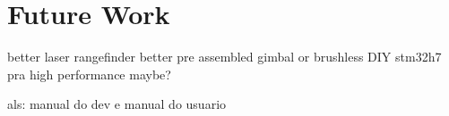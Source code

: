 
\chapter{Future Work}

better laser rangefinder
better pre assembled gimbal or brushless DIY
stm32h7 pra high performance maybe?

als: manual do dev e manual do usuario